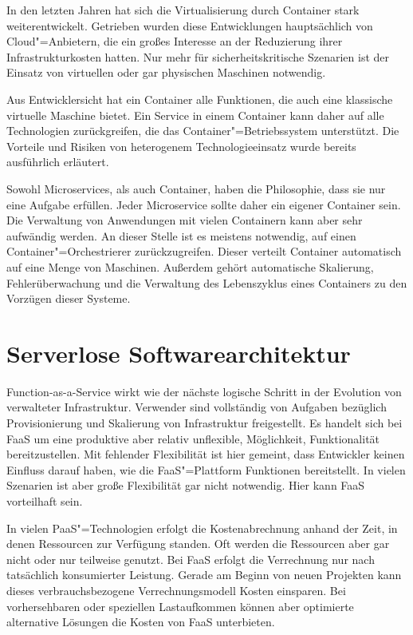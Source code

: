In den letzten Jahren hat sich die Virtualisierung durch Container stark weiterentwickelt. Getrieben wurden diese Entwicklungen hauptsächlich von Cloud"=Anbietern, die ein großes Interesse an der Reduzierung ihrer Infrastrukturkosten hatten. Nur mehr für sicherheitskritische Szenarien ist der Einsatz von virtuellen oder gar physischen Maschinen notwendig.

Aus Entwicklersicht hat ein Container alle Funktionen, die auch eine klassische virtuelle Maschine bietet. Ein Service in einem Container kann daher auf alle Technologien zurückgreifen, die das Container"=Betriebssystem unterstützt. Die Vorteile und Risiken von heterogenem Technologieeinsatz wurde bereits ausführlich erläutert.

Sowohl Microservices, als auch Container, haben die Philosophie, dass sie nur eine Aufgabe erfüllen. Jeder Microservice sollte daher ein eigener Container sein. Die Verwaltung von Anwendungen mit vielen Containern kann aber sehr aufwändig werden. An dieser Stelle ist es meistens notwendig, auf einen Container"=Orchestrierer zurückzugreifen. Dieser verteilt Container automatisch auf eine Menge von Maschinen. Außerdem gehört automatische Skalierung, Fehlerüberwachung und die Verwaltung des Lebenszyklus eines Containers zu den Vorzügen dieser Systeme.

\section{Serverlose Softwarearchitektur}

Function-as-a-Service wirkt wie der nächste logische Schritt in der Evolution von verwalteter Infrastruktur. Verwender sind vollständig von Aufgaben bezüglich Provisionierung und Skalierung von Infrastruktur freigestellt. Es handelt sich bei FaaS um eine produktive aber relativ unflexible, Möglichkeit, Funktionalität bereitzustellen. Mit fehlender Flexibilität ist hier gemeint, dass Entwickler keinen Einfluss darauf haben, wie die FaaS"=Plattform Funktionen bereitstellt. In vielen Szenarien ist aber große Flexibilität gar nicht notwendig. Hier kann FaaS vorteilhaft sein.

In vielen PaaS"=Technologien erfolgt die Kostenabrechnung anhand der Zeit, in denen Ressourcen zur Verfügung standen. Oft werden die Ressourcen aber gar nicht oder nur teilweise genutzt. Bei FaaS erfolgt die Verrechnung nur nach tatsächlich konsumierter Leistung. Gerade am Beginn von neuen Projekten kann dieses verbrauchsbezogene Verrechnungsmodell Kosten einsparen. Bei vorhersehbaren oder speziellen Lastaufkommen können aber optimierte alternative Lösungen die Kosten von FaaS unterbieten.


